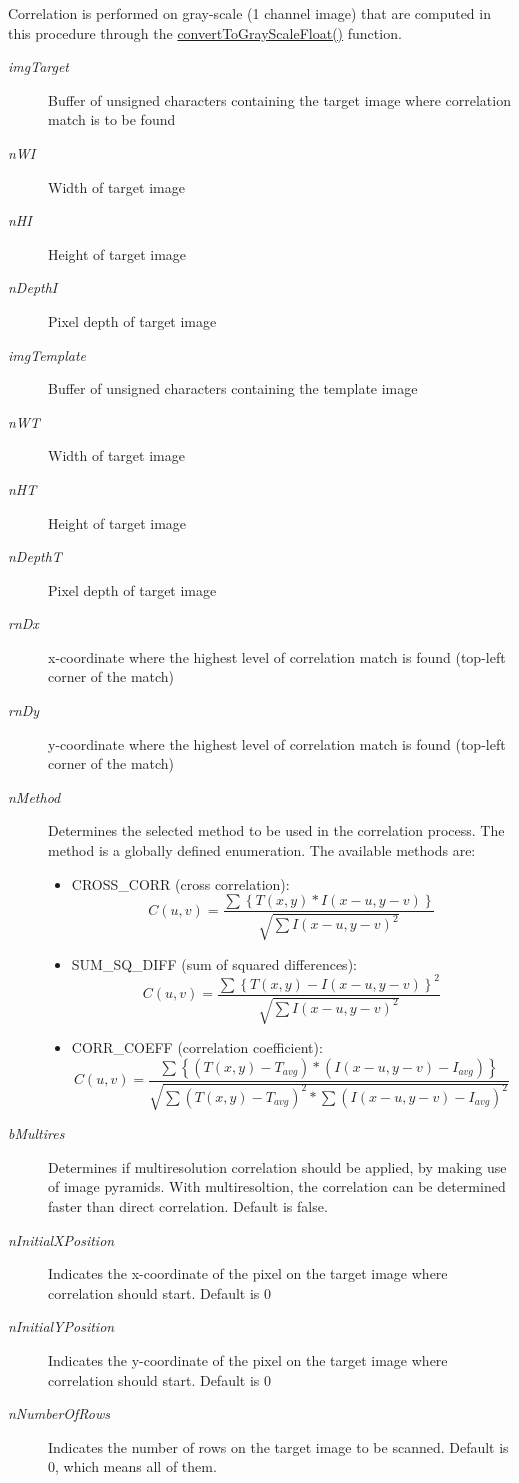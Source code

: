 \begin{Desc}
\item[Note:]Correlation is performed on gray-scale (1 channel image) that are computed in this procedure through the \hyperlink{classQcorr_d1b26ace597c0c4a0f64a0bd9576d4fc}{convertToGrayScaleFloat()} function. \end{Desc}
\begin{Desc}
\item[Parameters:]
\begin{description}
\item[{\em imgTarget}]Buffer of unsigned characters containing the target image where correlation match is to be found \item[{\em nWI}]Width of target image \item[{\em nHI}]Height of target image \item[{\em nDepthI}]Pixel depth of target image \item[{\em imgTemplate}]Buffer of unsigned characters containing the template image \item[{\em nWT}]Width of target image \item[{\em nHT}]Height of target image \item[{\em nDepthT}]Pixel depth of target image \item[{\em rnDx}]x-coordinate where the highest level of correlation match is found (top-left corner of the match) \item[{\em rnDy}]y-coordinate where the highest level of correlation match is found (top-left corner of the match) \item[{\em nMethod}]Determines the selected method to be used in the correlation process. The method is a globally defined enumeration. The available methods are:\begin{itemize}
\item CROSS\_\-CORR (cross correlation): \[ C(u,v) = \frac {\sum{\left\{T(x,y) * I(x-u,y-v)\right\}}} {\sqrt{ \sum{I(x-u,y-v)^2}}} \]\item SUM\_\-SQ\_\-DIFF (sum of squared differences): \[ C(u,v) = \frac {\sum{\left\{T(x,y)-I(x-u,y-v)\right\}^2}} {\sqrt{\sum{I(x-u,y-v)^2}}} \]\item CORR\_\-COEFF (correlation coefficient): \[ C(u,v) = \frac {\sum{\left\{(T(x,y)-T_{avg}) * (I(x-u,y-v)-I_{avg})\right\}}} {\sqrt{\sum{(T(x,y)-T_{avg})^2} * \sum{(I(x-u,y-v)-I_{avg})^2}}} \] \end{itemize}
\item[{\em bMultires}]Determines if multiresolution correlation should be applied, by making use of image pyramids. With multiresoltion, the correlation can be determined faster than direct correlation. Default is false. \item[{\em nInitialXPosition}]Indicates the x-coordinate of the pixel on the target image where correlation should start. Default is 0 \item[{\em nInitialYPosition}]Indicates the y-coordinate of the pixel on the target image where correlation should start. Default is 0 \item[{\em nNumberOfRows}]Indicates the number of rows on the target image to be scanned. Default is 0, which means all of them. \end{description}

\end{Desc}
